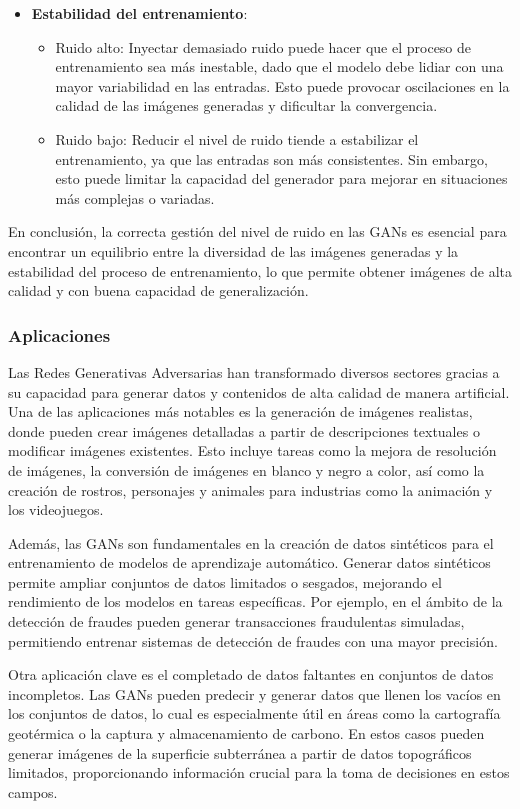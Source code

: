 \begin{itemize}
    \item \textbf{Estabilidad del entrenamiento}:
    \begin{itemize}
        \item Ruido alto: Inyectar demasiado ruido puede hacer que el proceso de entrenamiento sea más inestable, dado que el modelo debe lidiar con una mayor variabilidad en las entradas. Esto puede provocar oscilaciones en la calidad de las imágenes generadas y dificultar la convergencia.
        \item Ruido bajo: Reducir el nivel de ruido tiende a estabilizar el entrenamiento, ya que las entradas son más consistentes. Sin embargo, esto puede limitar la capacidad del generador para mejorar en situaciones más complejas o variadas.
    \end{itemize}
\end{itemize}

En conclusión, la correcta gestión del nivel de ruido en las GANs es esencial para encontrar un equilibrio entre la diversidad de las imágenes generadas y la estabilidad del proceso de entrenamiento, lo que permite obtener imágenes de alta calidad y con buena capacidad de generalización.

\subsubsection{Aplicaciones}

Las Redes Generativas Adversarias han transformado diversos sectores gracias a su capacidad para generar datos y contenidos de alta calidad de manera artificial. Una de las aplicaciones más notables es la generación de imágenes realistas, donde pueden crear imágenes detalladas a partir de descripciones textuales o modificar imágenes existentes. Esto incluye tareas como la mejora de resolución de imágenes, la conversión de imágenes en blanco y negro a color, así como la creación de rostros, personajes y animales para industrias como la animación y los videojuegos.

Además, las GANs son fundamentales en la creación de datos sintéticos para el entrenamiento de modelos de aprendizaje automático. Generar datos sintéticos permite ampliar conjuntos de datos limitados o sesgados, mejorando el rendimiento de los modelos en tareas específicas. Por ejemplo, en el ámbito de la detección de fraudes pueden generar transacciones fraudulentas simuladas, permitiendo entrenar sistemas de detección de fraudes con una mayor precisión.

Otra aplicación clave es el completado de datos faltantes en conjuntos de datos incompletos. Las GANs pueden predecir y generar datos que llenen los vacíos en los conjuntos de datos, lo cual es especialmente útil en áreas como la cartografía geotérmica o la captura y almacenamiento de carbono. En estos casos pueden generar imágenes de la superficie subterránea a partir de datos topográficos limitados, proporcionando información crucial para la toma de decisiones en estos campos.

